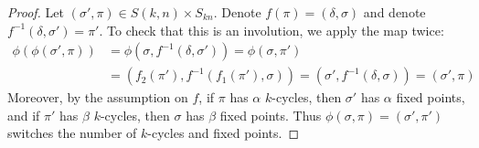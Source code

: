 \documentclass[10pt,a4paper]{amsart}
\begin{document}
\begin{proof}
    Let $(\sigma', \pi) \in S(k,n) \times S_{kn}$. Denote $f(\pi) = (\delta, \sigma)$ and denote $f^{-1}(\delta, \sigma') = \pi'$.
    To check that this is an involution, we apply the map twice: \begin{align*}
        \phi(\phi(\sigma', \pi))
        &= \phi\!\left(\sigma, f^{-1}(\delta, \sigma')\right)
        = \phi(\sigma,\pi') \\
        &= \left(f_2(\pi'),f^{-1}(f_1(\pi'),\sigma)\right)
        = \left(\sigma',f^{-1}(\delta,\sigma)\right)
        = \left(\sigma', \pi\right)
    \end{align*}
    Moreover, by the assumption on $f$, if $\pi$ has $\alpha$ $k$-cycles, then $\sigma'$ has $\alpha$ fixed points, and if $\pi'$ has $\beta$ $k$-cycles, then $\sigma$ has $\beta$ fixed points. Thus $\phi(\sigma, \pi) = (\sigma', \pi')$ switches the number of $k$-cycles and fixed points.
\end{proof}
\end{document}
